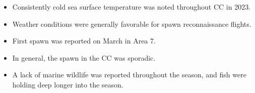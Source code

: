 \begin{itemize}

\item Consistently cold sea surface temperature was noted throughout CC in 2023.

\item Weather conditions were generally favorable
for spawn reconnaissance flights.

\item First spawn was reported on March  in Area 7.

\item In general, the spawn in the CC was sporadic.

\item A lack of marine wildlife was reported throughout the season, and
fish were holding deep longer into the season.

\end{itemize}
